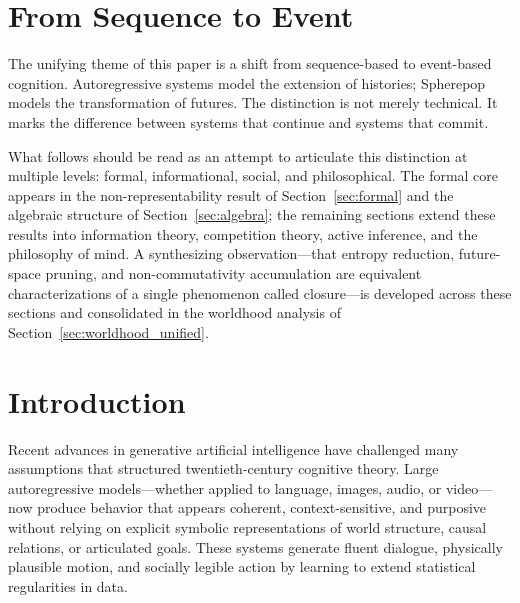 \documentclass[11pt]{article}
\begin{document}
\begin{abstract}
The central claim is that intelligence is not exhausted by prediction. It also
consists in the capacity to close worlds. Refusal is one of the events by which
such closure becomes possible.
\end{abstract}

\newpage
\section{From Sequence to Event}
\label{sec:bridge}

The unifying theme of this paper is a shift from sequence-based to event-based
cognition. Autoregressive systems model the extension of histories; Spherepop
models the transformation of futures. The distinction is not merely technical.
It marks the difference between systems that continue and systems that commit.

What follows should be read as an attempt to articulate this distinction at
multiple levels: formal, informational, social, and philosophical. The formal
core appears in the non-representability result of Section~\ref{sec:formal} and
the algebraic structure of Section~\ref{sec:algebra}; the remaining sections
extend these results into information theory, competition theory, active
inference, and the philosophy of mind. A synthesizing observation---that entropy
reduction, future-space pruning, and non-commutativity accumulation are
equivalent characterizations of a single phenomenon called closure---is
developed across these sections and consolidated in the worldhood analysis of
Section~\ref{sec:worldhood_unified}.

\section{Introduction}

Recent advances in generative artificial intelligence have challenged many
assumptions that structured twentieth-century cognitive theory. Large
autoregressive models---whether applied to language, images, audio, or
video---now produce behavior that appears coherent, context-sensitive, and
purposive without relying on explicit symbolic representations of world
structure, causal relations, or articulated goals. These systems generate
fluent dialogue, physically plausible motion, and socially legible action by
learning to extend statistical regularities in data.
\end{document}
